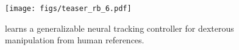 \begin{figure}[htbp]
  \texttt{[image: figs/teaser\_rb\_6.pdf]}
  \vspace{-23pt}
  \caption{ \footnotesize
 \href{https://meowuu7.github.io/DexTrack/}{\modelname} learns a generalizable neural tracking controller for dexterous manipulation from human references. 
}
\end{figure}
